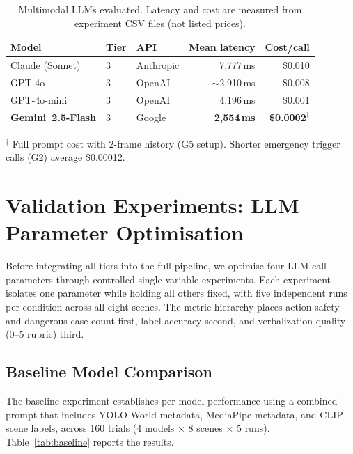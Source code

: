 \documentclass[journal]{IEEEtran}
\begin{document}
\begin{table}[!t]
  \caption{Multimodal LLMs evaluated. Latency and cost are measured from
           experiment CSV files (not listed prices).}
  \label{tab:models}
  \centering
  \small
  \begin{tabular}{lllrr}
    \toprule
    Model & Tier & API & Mean latency & Cost/call \\
    \midrule
    Claude (Sonnet)           & 3 & Anthropic & 7,777\,ms          & \$0.010 \\
    GPT-4o                    & 3 & OpenAI    & $\sim$2,910\,ms    & \$0.008 \\
    GPT-4o-mini               & 3 & OpenAI    & 4,196\,ms          & \$0.001 \\
    \textbf{Gemini~2.5-Flash} & 3 & Google    & \textbf{2,554\,ms} & \textbf{\$0.0002}$^\dagger$ \\
    \bottomrule
  \end{tabular}
  \vspace{2pt}
  \small $^\dagger$ Full prompt cost with 2-frame history (G5 setup).
  Shorter emergency trigger calls (G2) average \$0.00012.
\end{table}


\section{Validation Experiments: LLM Parameter Optimisation}
\label{sec:validation}

Before integrating all tiers into the full pipeline, we optimise four LLM
call parameters through controlled single-variable experiments.
Each experiment isolates one parameter while holding all others fixed,
with five independent runs per condition across all eight scenes.
The metric hierarchy places action safety and dangerous case count first,
label accuracy second, and verbalization quality (0--5 rubric) third.

\subsection{Baseline Model Comparison}
\label{sec:v_baseline}

The baseline experiment establishes per-model performance using a combined
prompt that includes YOLO-World metadata, MediaPipe metadata, and CLIP
scene labels, across 160 trials (4 models $\times$ 8 scenes $\times$ 5 runs).
Table~\ref{tab:baseline} reports the results.
\end{document}
